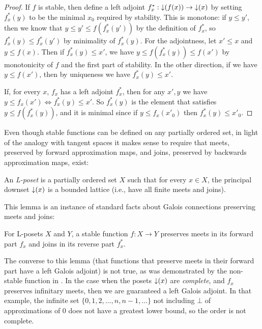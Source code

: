 \begin{proof}
  If $f$ is stable, then define a left adjoint
  $f^*_x : \mathop{\downarrow}(f(x)) \to \mathop{\downarrow}(x)$ by setting $f^*_x(y)$ to be
  the minimal $x_0$ required by stability. This is monotone: if
  $y \leq y'$, then we know that $y \leq y' \leq f(f^*_x(y'))$ by the
  definition of $f^*_x$, so $f^*_x(y) \leq f^*_x(y')$ by minimality of
  $f^*_x(y)$. For the adjointness, let $x' \leq x$ and $y \leq
  f(x)$. Then if $f^*_x(y) \leq x'$, we have
  $y \leq f(f^*_x(y)) \leq f(x')$ by monotonicity of $f$ and the first
  part of stability. In the other direction, if we have
  $y \leq f(x')$, then by uniqueness we have $f^*_x(y) \leq x'$.

  If, for every $x$, $f_x$ has a left adjoint $f^*_x$, then for any
  $x', y$ we have $y \leq f_x(x') \Leftrightarrow f^*_x(y) \leq
  x'$. So $f^*_x(y)$ is the element that satisfies
  $y \leq f(f^*_x(y))$, and it is minimal since if $y \leq f_x(x'_0)$
  then $f^*_x(y) \leq x'_0$.
\end{proof}

Even though stable functions can be defined on any partially ordered
set, in light of the analogy with tangent spaces it makes sense to
require that meets, preserved by forward approximation maps, and
joins, preserved by backwards approximation maps, exist:

\begin{definition}
  An \emph{L-poset} is a partially ordered set $X$ such that for every $x \in X$, the principal downset $\mathop{\downarrow}(x)$ is a bounded lattice (i.e., have all finite meets and joins).
\end{definition}

This lemma is an instance of standard facts about Galois connections
preserving meets and joins:

\begin{lemma}
  For L-posets $X$ and $Y$, a stable function $f : X \to Y$ preserves
  meets in its forward part $f_x$ and joins in its reverse part
  $f^*_x$.
\end{lemma}

The converse to this lemma (that functions that preserve meets in their forward part have a left Galois adjoint) is not true, as was demonstrated by the non-stable function in . In the case when the posets $\mathop{\downarrow}(x)$ are \emph{complete}, and $f_x$ preserves infinitary meets, then we are guaranteed a left Galois adjoint. In that example, the infinite set $\{0, 1, 2, \dots, n, n-1, \dots\}$ not including $\bot$ of approximations of $0$ does not have a greatest lower bound, so the order is not complete.

